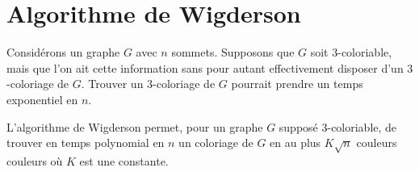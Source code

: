 \section{Algorithme de Wigderson} 
Considérons un graphe $G$ avec $n$ sommets. Supposons que $G$ soit $3$-coloriable, mais que l'on ait cette information sans pour autant effectivement disposer d'un $3$-coloriage de $G$. Trouver un $3$-coloriage de $G$ pourrait prendre un temps exponentiel en $n$. 

L'algorithme de Wigderson permet, pour un graphe $G$ supposé $3$-coloriable, de trouver en temps polynomial en $n$ un coloriage de $G$ en au plus $K\sqrt{n}$ couleurs couleurs où $K$ est une constante.

